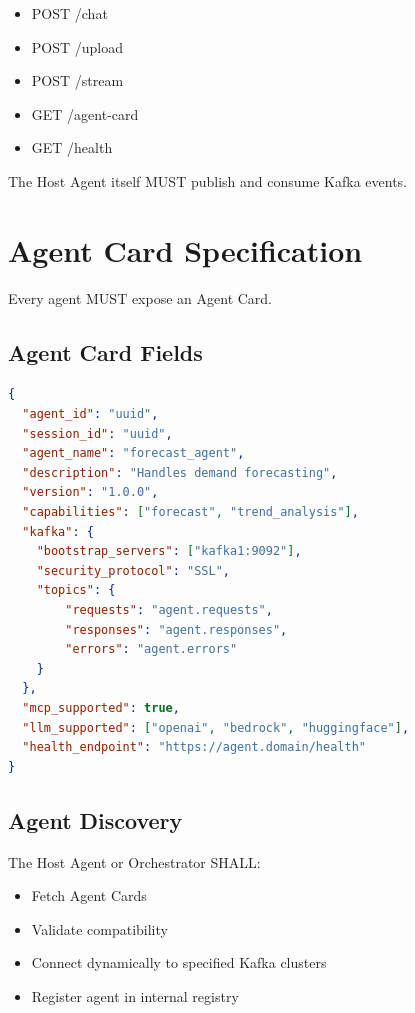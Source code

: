 \documentclass[12pt]{article}
\begin{document}
\begin{itemize}
    \item POST /chat
    \item POST /upload
    \item POST /stream
    \item GET /agent-card
    \item GET /health
\end{itemize}

The Host Agent itself MUST publish and consume Kafka events.

\section{Agent Card Specification}

Every agent MUST expose an Agent Card.

\subsection{Agent Card Fields}

\begin{lstlisting}[language=json]
{
  "agent_id": "uuid",
  "session_id": "uuid",
  "agent_name": "forecast_agent",
  "description": "Handles demand forecasting",
  "version": "1.0.0",
  "capabilities": ["forecast", "trend_analysis"],
  "kafka": {
    "bootstrap_servers": ["kafka1:9092"],
    "security_protocol": "SSL",
    "topics": {
        "requests": "agent.requests",
        "responses": "agent.responses",
        "errors": "agent.errors"
    }
  },
  "mcp_supported": true,
  "llm_supported": ["openai", "bedrock", "huggingface"],
  "health_endpoint": "https://agent.domain/health"
}
\end{lstlisting}

\subsection{Agent Discovery}

The Host Agent or Orchestrator SHALL:

\begin{itemize}
    \item Fetch Agent Cards
    \item Validate compatibility
    \item Connect dynamically to specified Kafka clusters
    \item Register agent in internal registry
\end{itemize}
\end{document}
